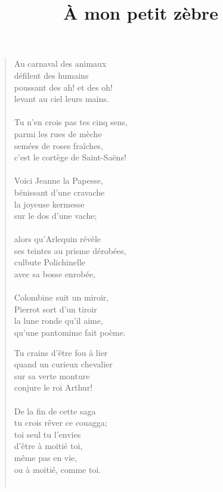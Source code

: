 \documentclass[twocolumn,12pt,a4paper]{article}
\title{À mon petit zèbre}
\author{}
\date{}
\begin{document}
\maketitle

\begin{verse}%
Au carnaval des animaux\\
défilent des humains\\
poussant des ah! et des oh!\\
levant au ciel leurs mains.\\
\ \\

Tu n'en crois pas tes cinq sens,\\
parmi les rues de mèche\\
semées de roses fraîches,\\
c'est le cortège de Saint-Saëns!\\
\ \\

Voici Jeanne la Papesse,\\
bénissant d'une cravache\\
la joyeuse kermesse\\
sur le dos d'une vache;\\
\ \\

alors qu'Arlequin révèle\\
ses teintes au prisme dérobées,\\
culbute Polichinelle\\
avec sa bosse enrobée,\\
\ \\

Colombine suit un miroir,\\
Pierrot sort d'un tiroir\\
la lune ronde qu'il aime,\\
qu'une pantomime fait poème.\\


\newpage

Tu crains d'être fou à lier\\
quand un curieux chevalier\\
sur sa verte monture\\
conjure le roi Arthur!\\
\ \\

De la fin de cette saga\\
tu crois rêver ce couagga;\\
toi seul tu l'envies\\
d'être à moitié toi,\\
même pas en vie,\\
ou à moitié, comme toi.\\
\ \\


\end{verse}
\end{document}
